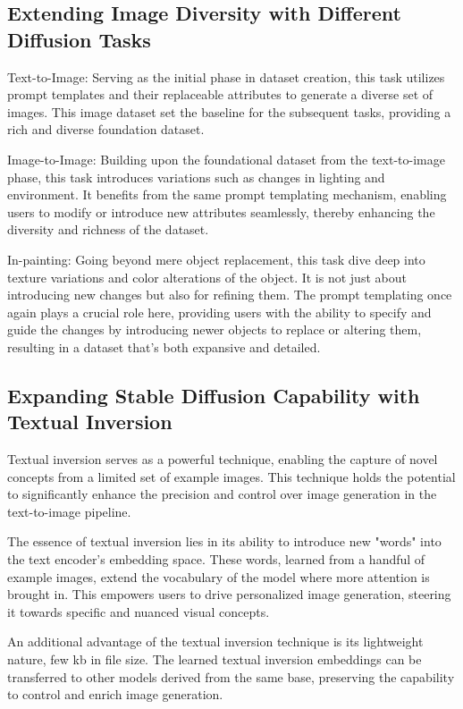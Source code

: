 \documentclass{article}
\begin{document}
\subsection{Extending Image Diversity with Different Diffusion Tasks}
Text-to-Image: Serving as the initial phase in dataset creation, this task utilizes prompt templates and their replaceable attributes to generate a diverse set of images. This image dataset set the baseline for the subsequent tasks, providing a rich and diverse foundation dataset.

Image-to-Image: Building upon the foundational dataset from the text-to-image phase, this task introduces variations such as changes in lighting and environment. It benefits from the same prompt templating mechanism, enabling users to modify or introduce new attributes seamlessly, thereby enhancing the diversity and richness of the dataset.

In-painting: Going beyond mere object replacement, this task dive deep into texture variations and color alterations of the object. It is not just about introducing new changes but also for refining them. The prompt templating once again plays a crucial role here, providing users with the ability to specify and guide the changes by introducing newer objects to replace or altering them, resulting in a dataset that's both expansive and detailed.

\subsection{Expanding Stable Diffusion Capability with Textual Inversion}
Textual inversion serves as a powerful technique, enabling the capture of novel concepts from a limited set of example images. This technique holds the potential to significantly enhance the precision and control over image generation in the text-to-image pipeline.

The essence of textual inversion lies in its ability to introduce new "words" into the text encoder's embedding space. These words, learned from a handful of example images, extend the vocabulary of the model where more attention is brought in. This empowers users to drive personalized image generation, steering it towards specific and nuanced visual concepts.

An additional advantage of the textual inversion technique is its lightweight nature, few kb in file size. The learned textual inversion embeddings can be transferred to other models derived from the same base, preserving the capability to control and enrich image generation.
\end{document}
